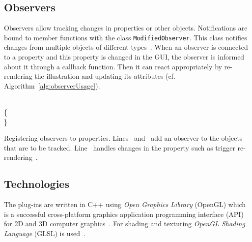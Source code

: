 \subsection{Observers}
\label{chap:observers}
Observers allow tracking changes in properties or other objects. Notifications are bound to member functions with the class \texttt{ModifiedObserver}. This class notifies changes from multiple objects of different types~\cite{misc:volumeshop101}. When an observer is connected to a property and this property is changed in the GUI, the observer is informed about it through a callback function. Then it can react appropriately by re-rendering the illustration and updating its attributes (cf. Algorithm~\ref{alg:observerUsage}).
\LinesNumbered
\begin{algorithm}
 \;
\;
\;\label{ln:prop1}
\;\label{ln:prop2}
\\
\{\\
\Indp{}\;\label{ln:rerender}
\Indm\}
\BlankLine
\caption{Registering observers to properties. Lines~\NlSty{\ref{ln:prop1}} and~\NlSty{\ref{ln:prop2}} add an observer to the objects that are to be tracked. Line~\NlSty{\ref{ln:rerender}} handles changes in the property such as trigger re-rendering~\cite{misc:volumeshop101}.}
\label{alg:observerUsage}
\end{algorithm}
\LinesNotNumbered
%
%
%

\subsection{Technologies}
The plug-ins are written in C++ using \emph{Open Graphics Library} (OpenGL) which is a successful cross-platform graphics application programming interface (API) for 2D and 3D computer graphics~\cite{book:computerGraphicsHill}. For shading and texturing \emph{OpenGL Shading Language} (GLSL) is used~\cite{misc:volumeshop101}.


